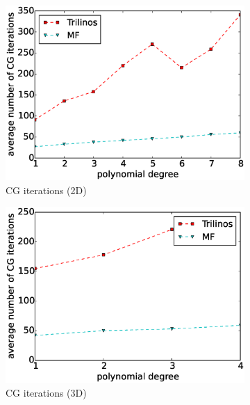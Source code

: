 \documentclass[times,doublespace]{nmeauth}
\begin{document}
\begin{figure}[!ht]
  \begin{subfigure}[b]{0.49\textwidth}
    \centering
    \includegraphics[width=\textwidth]{Emmy_RRZE_cg2d.eps}
    \caption{CG iterations (2D)}
    \label{fig:benchmark_miehe_Emmy_cg2}
  \end{subfigure}
  \begin{subfigure}[b]{0.49\textwidth}
    \centering
    \includegraphics[width=\textwidth]{Emmy_RRZE_cg3d.eps}
    \caption{CG iterations (3D)}
    \label{fig:benchmark_miehe_Emmy_cg3}
  \end{subfigure}
  ~
  \begin{subfigure}[b]{0.49\textwidth}
    \centering

\end{subfigure}
\end{figure}
\end{document}
